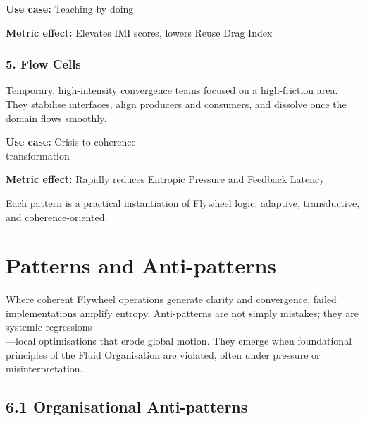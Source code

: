 \documentclass[12pt]{article}
\begin{document}
\textbf{Use case:} Teaching by doing

\textbf{Metric effect:} Elevates IMI scores, lowers Reuse Drag Index

\subsubsection*{5. Flow Cells}

Temporary, high-intensity convergence teams focused on a high-friction area. They stabilise interfaces, align producers and consumers, and dissolve once the domain flows smoothly.

\textbf{Use case:} Crisis-to-coherence \\
transformation

\textbf{Metric effect:} Rapidly reduces Entropic Pressure and Feedback Latency

\vspace{1em}
Each pattern is a practical instantiation of Flywheel logic: adaptive, transductive, and coherence-oriented.

\section{Patterns and Anti-patterns}

Where coherent Flywheel operations generate clarity and convergence, failed implementations amplify entropy. Anti-patterns are not simply mistakes; they are systemic regressions\\---local optimisations that erode global motion. They emerge when foundational principles of the Fluid Organisation are violated, often under pressure or misinterpretation.

\subsection*{6.1 Organisational Anti-patterns}
\end{document}
